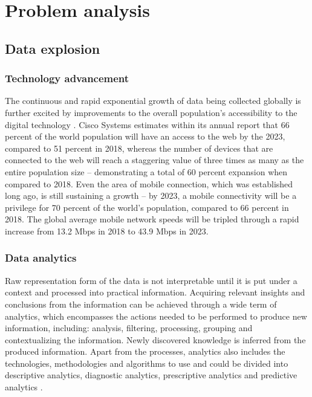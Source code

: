 \documentclass[a4paper,twoside,12pt]{book}
\begin{document}
\chapter{Problem analysis}

\section{Data explosion}

\subsection{Technology advancement}
The continuous and rapid exponential growth of data being collected globally is further excited by improvements to the overall population's accessibility to the digital technology \cite{bib:big_data_analytics}. Cisco Systems estimates within its annual report \cite{bib:cisco_annual} that 66 percent of the world population will have an access to the web by the 2023, compared to 51 percent in 2018, whereas the number of devices that are connected to the web will reach a staggering value of three times as many as the entire population size – demonstrating a total of 60 percent expansion when compared to 2018. Even the area of mobile connection, which was established long ago, is still sustaining a growth – by 2023, a mobile connectivity will be a privilege for 70 percent of the world's population, compared to 66 percent in 2018. The global average mobile network speeds will be tripled through a rapid increase from 13.2 Mbps in 2018 to 43.9 Mbps in 2023.

\subsection{Data analytics}
Raw representation form of the data is not interpretable until it is put under a context and processed into practical information.
Acquiring relevant insights and conclusions from the information can be achieved through a wide term of analytics, which encompasses the actions needed to be performed to produce new information, including: analysis, filtering, processing, grouping and contextualizing the information. Newly discovered knowledge is inferred from the produced information.
Apart from the processes, analytics also includes the technologies, methodologies and algorithms to use and could be divided into descriptive analytics, diagnostic analytics, prescriptive analytics and predictive analytics \cite{bib:big_data_analytics}.
\end{document}

